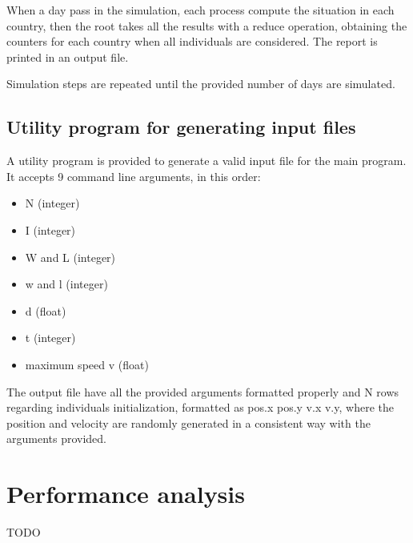 \documentclass[10pt]{article}
\begin{document}
	When a day pass in the simulation, each process compute the situation in each country, then the root takes all the results with a reduce operation, obtaining the counters for each country when all individuals are considered. The report is printed in an output file.
	
	Simulation steps are repeated until the provided number of days are simulated.
	 
	
	\subsection{Utility program for generating input files} \label{utility}
	A utility program is provided to generate a valid input file for the main program. It accepts 9 command line arguments, in this order:
	\begin{itemize}
		\item N (integer)
		\item I (integer)
		\item W and L (integer)
		\item w and l (integer)
		\item d (float)
		\item t (integer)
		\item maximum speed v (float)
	\end{itemize}

	The output file have all the provided arguments formatted properly and N rows regarding individuals initialization, formatted as {pos.x pos.y v.x v.y}, where the position and velocity are randomly generated in a consistent way with the arguments provided.

	
	\section{Performance analysis}
	TODO
	
\end{document}
